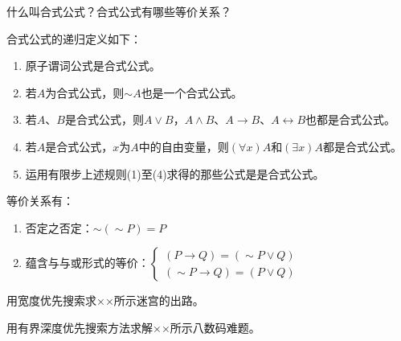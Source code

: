 \begin{question}
什么叫合式公式？合式公式有哪些等价关系？
\end{question}	
\begin{solution}
合式公式的递归定义如下：
	\begin{enumerate}
		\item 原子谓词公式是合式公式。
		\item 若$A$为合式公式，则$\sim A$也是一个合式公式。
		\item 若$A$、$B$是合式公式，则$A \vee B$，$A \wedge B$、$A \to B$、$A \leftrightarrow B$也都是合式公式。
		\item 若$A$是合式公式，$x$为$A$中的自由变量，则$\left(\forall x\right) A$和$\left(\exists x\right) A$都是合式公式。
		\item 运用有限步上述规则(1)至(4)求得的那些公式是是合式公式。
	\end{enumerate}
等价关系有：
	\begin{enumerate}
		\item 否定之否定：$\sim(\sim P)=P$
		\item 蕴含与与或形式的等价：$\begin{cases}
		(P\to Q)=(\sim P \vee Q)\\
		(\sim P\to Q)=(P \vee Q)
		\end{cases}$ 
	\end{enumerate}
\end{solution}

\begin{question}
用宽度优先搜索求××所示迷宫的出路。
\end{question}
\begin{solution}
\end{solution}

\begin{question}
用有界深度优先搜索方法求解××所示八数码难题。
\end{question}
\begin{solution}
\end{solution}

